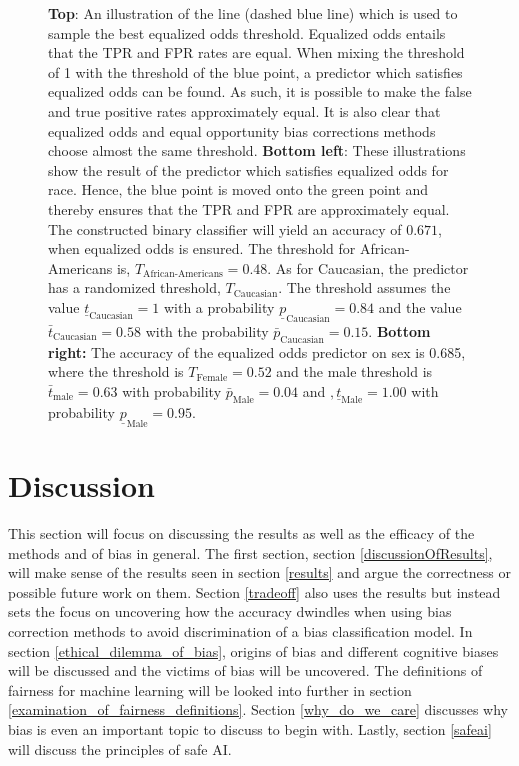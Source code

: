 \documentclass[11pt, fleqn, titlepage]{article}
\begin{document}
\begin{figure}[H]
		\caption{\textbf{Top}: An illustration of the line (dashed blue line) which is used to sample the best equalized odds threshold. Equalized odds entails that the TPR and FPR rates are equal. When mixing the threshold of 1 with the threshold of the blue point, a predictor which satisfies equalized odds can be found. As such, it is possible to make the false and true positive rates approximately equal. It is also clear that equalized odds and equal opportunity bias corrections methods choose almost the same threshold.  \textbf{Bottom left}: These illustrations show the result of the predictor which satisfies equalized odds for race. Hence, the blue point is moved onto the green point and thereby ensures that the TPR and FPR are approximately equal. The constructed binary classifier will yield an accuracy of $ 0.671 $, when equalized odds is ensured. The threshold for African-Americans is, $ T_{\text{African-Americans}} = 0.48 $. As for Caucasian, the predictor has a randomized threshold, $ T_{\text{Caucasian}} $. The threshold assumes the value $\underline t_{\text{Caucasian}} = 1 $  with a probability $ \underline p_{\text{Caucasian}}= 0.84 $ and the value $ \bar t_{\text{Caucasian}} = 0.58 $ with the probability $\bar p_{\text{Caucasian}} = 0.15 $. \textbf{Bottom right:} The accuracy of the equalized odds predictor on sex is 0.685, where the threshold is $T_{\text{Female}}=0.52$ and the male threshold is $\bar t_{\text{male}} = 0.63$ with probability $\bar p_{\text{Male}} = 0.04$ and $,\underline t_{\text{Male}} = 1.00$ with probability $\underline p_{\text{Male}} = 0.95$.}
		\label{fig:equalizedOdds}
	\end{figure}
	
	
	\section{Discussion} \label{discussion}	
	This section will focus on discussing the results as well as the efficacy of the methods and of bias in general. The first section, section \ref{discussionOfResults}, will make sense of the results seen in section \ref{results} and argue the correctness or possible future work on them. Section \ref{tradeoff} also uses the results but instead sets the focus on uncovering how the accuracy dwindles when using bias correction methods to avoid discrimination of a bias classification model. In section \ref{ethical_dilemma_of_bias}, origins of bias and different cognitive biases will be discussed and the victims of bias will be uncovered. The definitions of fairness for machine learning will be looked into further in section \ref{examination_of_fairness_definitions}. Section \ref{why_do_we_care} discusses why bias is even an important topic to discuss to begin with. Lastly, section \ref{safeai} will discuss the principles of safe AI.
	
\end{document}
